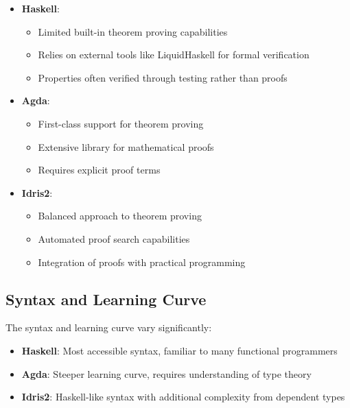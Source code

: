 \documentclass[]{rptuseminar}
\begin{document}
\begin{itemize}  
    \item \textbf{Haskell}:   
        \begin{itemize}  
            \item Limited built-in theorem proving capabilities  
            \item Relies on external tools like LiquidHaskell for formal verification  
            \item Properties often verified through testing rather than proofs  
        \end{itemize}  
    
    \item \textbf{Agda}:  
        \begin{itemize}  
            \item First-class support for theorem proving  
            \item Extensive library for mathematical proofs  
            \item Requires explicit proof terms  
        \end{itemize}  
    
    \item \textbf{Idris2}:  
        \begin{itemize}  
            \item Balanced approach to theorem proving  
            \item Automated proof search capabilities  
            \item Integration of proofs with practical programming  
        \end{itemize}  
\end{itemize}  

\subsection{Syntax and Learning Curve}  
The syntax and learning curve vary significantly:  

\begin{itemize}  
    \item \textbf{Haskell}: Most accessible syntax, familiar to many functional programmers  
    \item \textbf{Agda}: Steeper learning curve, requires understanding of type theory  
    \item \textbf{Idris2}: Haskell-like syntax with additional complexity from dependent types  
\end{itemize}  
\end{document}
